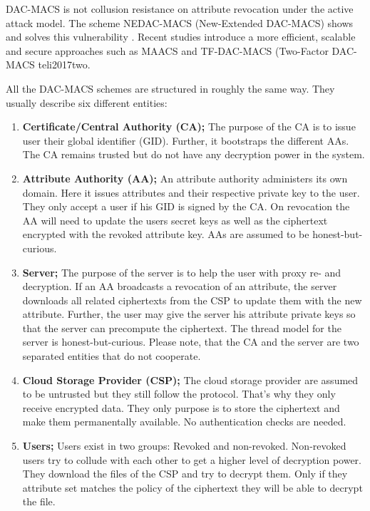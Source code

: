 \ac{DAC-MACS} is not collusion resistance on attribute revocation under the active attack model. The scheme \ac{NEDAC-MACS} (New-Extended \ac{DAC-MACS}) shows and solves this vulnerability \cite{wu2017security}. Recent studies introduce a more efficient, scalable and secure approaches such as \ac{MAACS} \cite{li2016secure} and \ac{TF-DAC-MACS} (Two-Factor \ac{DAC-MACS} 	te{li2017two}. 

All the \ac{DAC-MACS} schemes are structured in roughly the same way. They usually describe six different entities:

\begin{enumerate}
	\item \textbf{Certificate/Central Authority (\ac{CA});} The purpose of the \ac{CA} is to issue user their global identifier (\ac{GID}). Further, it bootstraps the different \ac{AA}s. The \ac{CA} remains trusted but do not have any decryption power in the system. 
	\item \textbf{Attribute Authority (\ac{AA});} An attribute authority administers its own domain. Here it issues attributes and their respective private key to the user. They only accept a user if his \ac{GID} is signed by the \ac{CA}. 
	On revocation the AA will need to update the users secret keys as well as the ciphertext encrypted with the revoked attribute key. \ac{AA}s are assumed to be honest-but-curious.
	\item \textbf{Server;} The purpose of the server is to help the user with proxy re- and decryption. If an \ac{AA} broadcasts a revocation of an attribute, the server downloads all related ciphertexts from the \ac{CSP} to update them with the new attribute. 
	Further, the user may give the server his attribute private keys so that the server can precompute the ciphertext. The thread model for the server is honest-but-curious. Please note, that the \ac{CA} and the server are two separated entities that do not cooperate.
	\item \textbf{Cloud Storage Provider (\ac{CSP});} The cloud storage provider are assumed to be untrusted but they still follow the protocol. That’s why they only receive encrypted data. They only purpose is to store the ciphertext and make them permanentally available. No authentication checks are needed.
	\item \textbf{Users;} Users exist in two groups: Revoked and non-revoked. Non-revoked users try to collude with each other to get a higher level of decryption power. They download the files of the \ac{CSP} and try to decrypt them. Only if they attribute set matches the policy of the ciphertext they will be able to decrypt the file. 

\end{enumerate}
